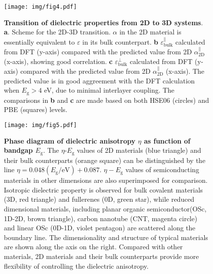 \documentclass[journal=ancac3,manuscript=article,email=true,hyperref=true,keywords=false]{achemso}
\begin{document}
\begin{figure}[H]
\centering
\texttt{[image: img/fig4.pdf]}
\caption{\label{fig-4} \textbf{Transition of dielectric properties
    from 2D to 3D systems}. \textbf{a}. Scheme for the 2D-3D
  transition. $\alpha$ in the 2D material is essentially equivalent to
  $\varepsilon$ in its bulk counterpart. \textbf{b}
  $\varepsilon_{\mathrm{bulk}}^{\parallel}$ calculated from DFT
  (y-axis) compared with the predicted value from 2D
  $\alpha_{\mathrm{2D}}^{\parallel}$ (x-axis), showing good correlation. \textbf{c}
  $\varepsilon_{\mathrm{bulk}}^{\perp}$ calculated from DFT (y-axis)
  compared with the predicted value from 2D $\alpha_{\mathrm{2D}}^{\parallel}$
  (x-axis). The predicted value is in good aggreement with the DFT
  calculation when $E_{\mathrm{g}}>4$ eV, due to minimal interlayer
  coupling. The comparisons in \textbf{b} and \textbf{c} are made
  based on both HSE06 (circles) and PBE (squares) levels.}
\end{figure}

\begin{figure}[H]
  \centering
  \texttt{[image: img/fig5.pdf]}
  \caption{\textbf{Phase diagram of dielectric anisotropy $\eta$ as
      function of bandgap $E_{\mathrm{g}}$}. The
    $\eta$-$E_{\mathrm{g}}$ values of 2D materials (blue triangle) and
    their bulk counterparts (orange square) can be distinguished by
    the line $\eta=0.048(E_{\mathrm{g}}/\mathrm{eV})+0.087$. $\eta-E_{\mathrm{g}}$ values of
    semiconducting materials in other dimensions are also superimposed
    for comparison. Isotropic dielectric property is observed for bulk
    covalent materials (3D, red triangle) and fullerenes (0D, green
    star), while reduced dimensional materials, including planar
    organic semiconductor(OSc, 1D-2D, brown triangle), carbon nanotube
    (CNT, magenta circle) and linear OSc (0D-1D, violet pentagon) are
    scattered along the boundary line. The dimensionality and
    structure of typical materials are shown along the axis on the
    right. Compared with other materials, 2D materials and their bulk
    counterparts provide more flexibility of controlling the
    dielectric anisotropy.}
  \label{fig:aniso}
\end{figure}
\end{document}
